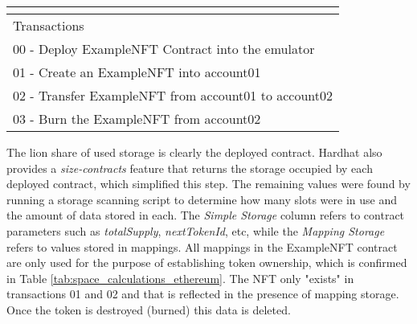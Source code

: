 \documentclass[../NFTComp_IEEE.tex]{subfiles}
\begin{document}
\begin{table}[ht]
{\begin{tabular}{ccccc}
            \multicolumn{1}{l}{}                               & \multicolumn{1}{l}{}                                                           & \multicolumn{1}{l}{}                         & \multicolumn{1}{l}{}                          & \multicolumn{1}{l}{}                \\ \hline
            \multicolumn{5}{|l|}{Transactions}                                                                                                                                                                                                                                       \\ \hline
            \multicolumn{5}{|l|}{00 - Deploy ExampleNFT Contract into the emulator}                                                                                                                                                                                                  \\ \hline
            \multicolumn{5}{|l|}{01 - Create an ExampleNFT into account01}                                                                                                                                                                                                           \\ \hline
            \multicolumn{5}{|l|}{02 - Transfer ExampleNFT from account01 to account02}                                                                                                                                                                                               \\ \hline
            \multicolumn{5}{|l|}{03 - Burn the ExampleNFT from account02}                                                                                                                                                                                                            \\ \hline
        \end{tabular}%
    }
\end{table}

The lion share of used storage is clearly the deployed contract. Hardhat also provides a \textit{size-contracts} feature that returns the storage occupied by each deployed contract, which simplified this step. The remaining values were found by running a storage scanning script to determine how many slots were in use and the amount of data stored in each. The \textit{Simple Storage} column refers to contract parameters such as \textit{totalSupply}, \textit{nextTokenId}, etc, while the \textit{Mapping Storage} refers to values stored in mappings. All mappings in the ExampleNFT contract are only used for the purpose of establishing token ownership, which is confirmed in Table \ref{tab:space_calculations_ethereum}. The NFT only "exists" in transactions 01 and 02 and that is reflected in the presence of mapping storage. Once the token is destroyed (burned) this data is deleted.
\end{document}
